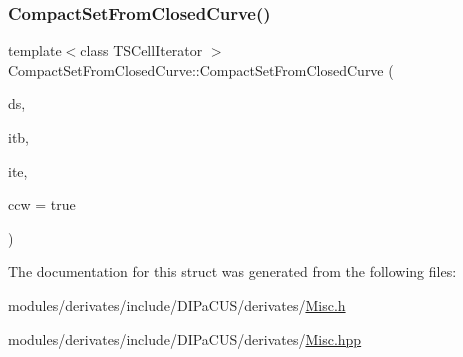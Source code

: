 \subsubsection{\texorpdfstring{Compact\+Set\+From\+Closed\+Curve()}{CompactSetFromClosedCurve()}}
{\footnotesize\ttfamily template$<$class T\+S\+Cell\+Iterator $>$ \\
Compact\+Set\+From\+Closed\+Curve\+::\+Compact\+Set\+From\+Closed\+Curve (\begin{DoxyParamCaption}\item[{\hyperlink{structDIPaCUS_1_1Misc_1_1CompactSetFromClosedCurve_a47e3100b4196961a629785d14f6ad645}{Digital\+Set} \&}]{ds,  }\item[{T\+S\+Cell\+Iterator}]{itb,  }\item[{T\+S\+Cell\+Iterator}]{ite,  }\item[{bool}]{ccw = {\ttfamily true} }\end{DoxyParamCaption})}



The documentation for this struct was generated from the following files\+:\begin{DoxyCompactItemize}
\item 
modules/derivates/include/\+D\+I\+Pa\+C\+U\+S/derivates/\hyperlink{Misc_8h}{Misc.\+h}\item 
modules/derivates/include/\+D\+I\+Pa\+C\+U\+S/derivates/\hyperlink{Misc_8hpp}{Misc.\+hpp}\end{DoxyCompactItemize}
